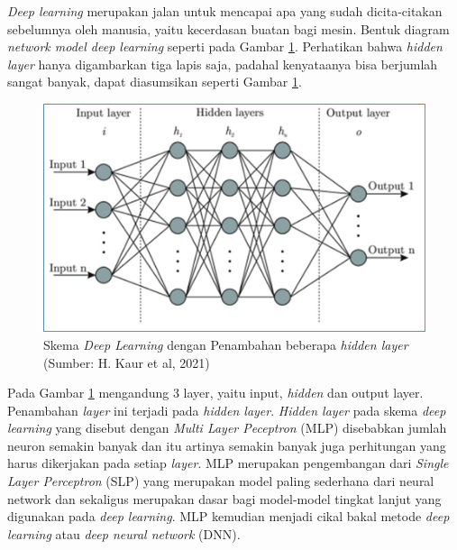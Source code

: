 \textit{Deep learning} merupakan jalan untuk mencapai apa yang sudah dicita-citakan sebelumnya oleh manusia, yaitu kecerdasan buatan bagi mesin. Bentuk diagram \textit{network model deep learning} seperti pada Gambar \ref{img:Skema-Deep-Learning-Hidden-Layer}. Perhatikan bahwa \textit{hidden layer} hanya digambarkan tiga lapis saja, padahal kenyataanya bisa berjumlah sangat banyak, dapat diasumsikan seperti Gambar \ref{img:Skema-Deep-Learning-Hidden-Layer}.

\begin{figure}[H]
	\vspace{-0.1cm}
	\begin{center}
		\includegraphics[width=1\columnwidth]{bab2/Gambar/Picture13.png}
	\end{center}
	\vspace{-0.2cm}
	\captionsetup{justification=centering}
	\caption{Skema \textit{Deep Learning} dengan Penambahan beberapa \textit{hidden layer}\\(Sumber: H. Kaur et al, 2021)}\label{img:Skema-Deep-Learning-Hidden-Layer}
\end{figure}

Pada Gambar \ref{img:Skema-Deep-Learning-Hidden-Layer} mengandung 3 layer, yaitu input, \textit{hidden} dan output layer. Penambahan \textit{layer} ini terjadi pada \textit{hidden layer}. \textit{Hidden layer} pada skema \textit{deep learning} yang disebut dengan \textit{Multi Layer Peceptron} (MLP) disebabkan jumlah neuron semakin banyak dan itu artinya semakin banyak juga perhitungan yang harus dikerjakan pada setiap \textit{layer}. MLP merupakan pengembangan dari \textit{Single Layer Perceptron} (SLP) yang merupakan model paling sederhana dari neural network dan sekaligus merupakan dasar bagi model-model tingkat lanjut yang digunakan pada \textit{deep learning}. MLP kemudian menjadi cikal bakal metode \textit{deep learning} atau \textit{deep neural network} (DNN).

